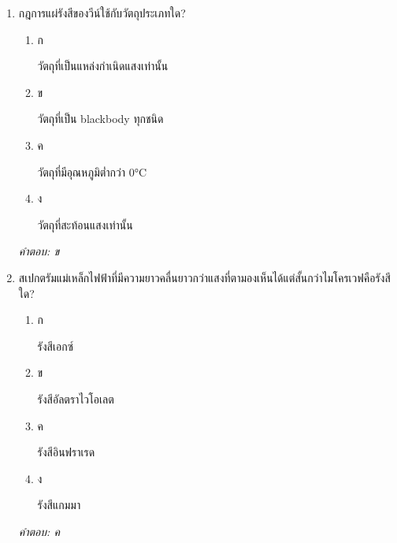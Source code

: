 \documentclass[12pt]{article}
\begin{document}
\begin{enumerate}[label=\arabic*., itemsep=0.5\baselineskip, topsep=0.5\baselineskip, leftmargin=*]
\item กฎการแผ่รังสีของวีน์ใช้กับวัตถุประเภทใด?
\begin{enumerate}[label=\alph*)., itemsep=0.3\baselineskip, topsep=0.3\baselineskip]
\item ก\ 
\begin{minipage}[t]{0.9\linewidth}
\raggedright วัตถุที่เป็นแหล่งกำเนิดแสงเท่านั้น
\end{minipage}
\item ข\ 
\begin{minipage}[t]{0.9\linewidth}
\raggedright วัตถุที่เป็น blackbody ทุกชนิด
\end{minipage}
\item ค\ 
\begin{minipage}[t]{0.9\linewidth}
\raggedright วัตถุที่มีอุณหภูมิต่ำกว่า 0°C
\end{minipage}
\item ง\ 
\begin{minipage}[t]{0.9\linewidth}
\raggedright วัตถุที่สะท้อนแสงเท่านั้น
\end{minipage}
\end{enumerate}
\vspace{-0.3\baselineskip}
\begin{small}
\textit{คำตอบ: ข}
\end{small}

\item สเปกตรัมแม่เหล็กไฟฟ้าที่มีความยาวคลื่นยาวกว่าแสงที่ตามองเห็นได้แต่สั้นกว่าไมโครเวฟคือรังสีใด?
\begin{enumerate}[label=\alph*)., itemsep=0.3\baselineskip, topsep=0.3\baselineskip]
\item ก\ 
\begin{minipage}[t]{0.9\linewidth}
\raggedright รังสีเอกซ์
\end{minipage}
\item ข\ 
\begin{minipage}[t]{0.9\linewidth}
\raggedright รังสีอัลตราไวโอเลต
\end{minipage}
\item ค\ 
\begin{minipage}[t]{0.9\linewidth}
\raggedright รังสีอินฟราเรด
\end{minipage}
\item ง\ 
\begin{minipage}[t]{0.9\linewidth}
\raggedright รังสีแกมมา
\end{minipage}
\end{enumerate}
\vspace{-0.3\baselineskip}
\begin{small}
\textit{คำตอบ: ค}
\end{small}


\end{enumerate}
\end{document}
